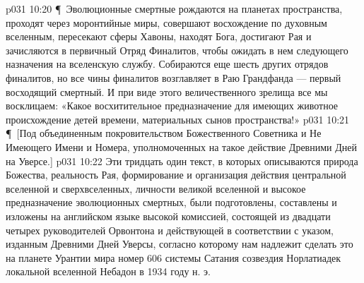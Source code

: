 \vs p031 10:20 \P\ Эволюционные смертные рождаются на планетах пространства, проходят через моронтийные миры, совершают восхождение по духовным вселенным, пересекают сферы Хавоны, находят Бога, достигают Рая и зачисляются в первичный Отряд Финалитов, чтобы ожидать в нем следующего назначения на вселенскую службу. Собираются еще шесть других отрядов финалитов, но все чины финалитов возглавляет в Раю Грандфанда --- первый восходящий смертный. И при виде этого величественного зрелища все мы восклицаем: «Какое восхитительное предназначение для имеющих животное происхождение детей времени, материальных сынов пространства!»
\vs p031 10:21 \P\ [Под объединенным покровительством Божественного Советника и Не Имеющего Имени и Номера, уполномоченных на такое действие Древними Дней на Уверсе.]
\separatorline
\vs p031 10:22 Эти тридцать один текст, в которых описываются природа Божества, реальность Рая, формирование и организация действия центральной вселенной и сверхвселенных, личности великой вселенной и высокое предназначение эволюционных смертных, были подготовлены, составлены и изложены на английском языке высокой комиссией, состоящей из двадцати четырех руководителей Орвонтона и действующей в соответствии с указом, изданным Древними Дней Уверсы, согласно которому нам надлежит сделать это на планете Урантии мира номер 606 системы Сатания созвездия Норлатиадек локальной вселенной Небадон в 1934 году н. э.
